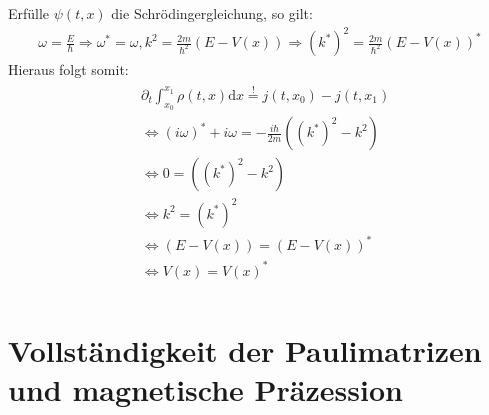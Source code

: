 \documentclass[a4paper,11pt]{article}
\begin{document}
Erfülle $\psi(t, x)$ die Schrödingergleichung, so gilt:
\begin{align}
        \omega = \frac{E}{\hbar} \Rightarrow \omega^* = \omega, k^2 = \frac{2m}{\hbar^2}(E-V(x)) \Rightarrow (k^*)^2 = \frac{2m}{\hbar^2}(E-V(x))^*
\end{align}
Hieraus folgt somit:
\begin{align}
        \begin{split}
                &\partial_t \int_{x_0}^{x_1} \rho(t, x)\text{d}x \overset{!}{=} j(t, x_0) - j(t, x_1) \\
                &\Leftrightarrow (i\omega)^* + i\omega = -\frac{i\hbar}{2m}((k^*)^2 - k^2) \\
                &\Leftrightarrow 0 = ((k^*)^2 - k^2) \\
                &\Leftrightarrow k^2 = (k^*)^2 \\
                &\Leftrightarrow (E-V(x)) = (E-V(x))^* \\
                &\Leftrightarrow V(x) = V(x)^* \\
        \end{split}
\end{align}

\section{Vollständigkeit der Paulimatrizen und magnetische Präzession}
\end{document}
